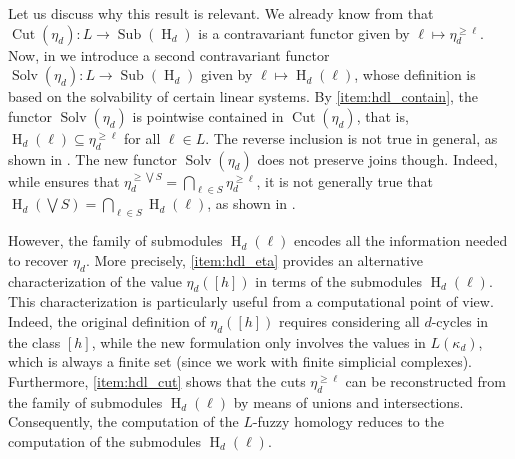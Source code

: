 \documentclass[a4paper,10pt]{article}
\DeclareMathOperator{\cut}{Cut}
\DeclareMathOperator{\sub}{Sub}
\DeclareMathOperator{\solv}{Solv}
\DeclareMathOperator{\Ho}{H}
\begin{document}
Let us discuss why this result is relevant. We already know from  that \(\cut(\eta_d):L \to \sub(\Ho_d)\) is a contravariant functor given by \(\ell \mapsto \eta_d^{\geq \ell}\). Now, in  we introduce a second contravariant functor \(\solv(\eta_d): L \to \sub(\Ho_d)\) given by \(\ell \mapsto \Ho_d(\ell)\), whose definition is based on the solvability of certain linear systems. By \cref{item:hdl_contain}, the functor \(\solv(\eta_d)\) is pointwise contained in \(\cut(\eta_d)\), that is, \(\Ho_d(\ell) \subseteq \eta_d^{\geq \ell}\) for all \(\ell \in L\). The reverse inclusion is not true in general, as shown in .
The new functor \(\solv(\eta_d)\) does not preserve joins though. Indeed, while  ensures that \(\eta_d^{\geq \bigvee S}= \bigcap_{\ell \in S}\eta_d^{\geq \ell}\), it is not generally true that \(\Ho_d(\bigvee S) = \bigcap_{\ell \in S} \Ho_d(\ell)\), as shown in .

However, the family of submodules \(\Ho_d(\ell)\) encodes all the information needed to recover \(\eta_d\). More precisely, \cref{item:hdl_eta} provides an alternative characterization of the value \(\eta_d([h])\) in terms of the submodules \(\Ho_d(\ell)\). This characterization is particularly useful from a computational point of view. Indeed, the original definition of \(\eta_d([h])\) requires considering all \(d\)-cycles in the class \([h]\), while the new formulation only involves the values in \(L(\kappa_d)\), which is always a finite set (since we work with finite simplicial complexes). Furthermore, \cref{item:hdl_cut} shows that the cuts \(\eta_d^{\geq \ell}\) can be reconstructed from the family of submodules \(\Ho_d(\ell)\) by means of unions and intersections. Consequently, the computation of the \(L\)-fuzzy homology reduces to the computation of the submodules \(\Ho_d(\ell)\).
\end{document}
